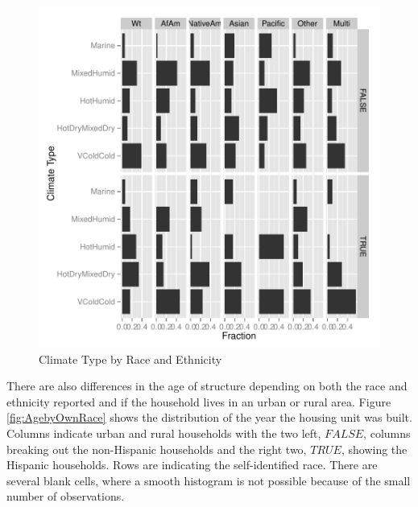 \documentclass{article}
\begin{document}
\begin{figure}[htbp]
\begin{center}
\caption{Climate Type by Race and Ethnicity}
\label{fig:HeatFuel}
\includegraphics{DraftEdwardsWoods-009}
\end{center}
\end{figure}

There are also differences in the age of structure depending on both the race and ethnicity reported and if the household lives in an urban or rural area.  Figure \ref{fig:AgebyOwnRace} shows the distribution of the year the housing unit was built.  Columns indicate urban and rural households with the two left, $FALSE$, columns breaking out the non-Hispanic households and the right two, $TRUE$, showing the Hispanic households.  Rows are indicating the self-identified race.  There are several blank cells, where a smooth histogram is not possible because of the small number of observations.
\end{document}
